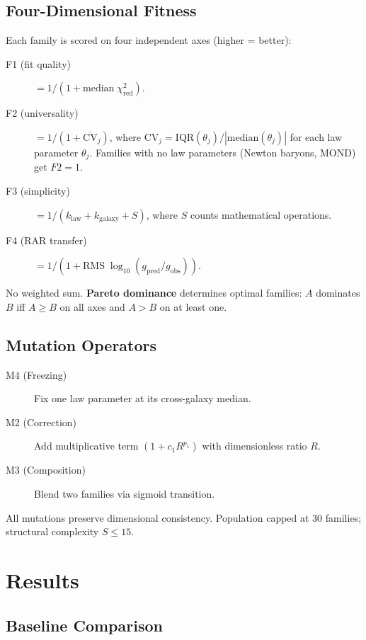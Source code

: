 \documentclass[aps,prl,twocolumn,superscriptaddress,showpacs]{revtex4-2}
\begin{document}
\subsection{Four-Dimensional Fitness}\label{sec:fitness}

Each family is scored on four independent axes (higher = better):

\begin{description}
    \item[F1 (fit quality)] $= 1/(1 + \mathrm{median}\;\chi^2_\mathrm{red})$.
    \item[F2 (universality)] $= 1/(1 + \overline{\mathrm{CV}}_j)$, where $\mathrm{CV}_j = \mathrm{IQR}(\theta_j)/|\mathrm{median}(\theta_j)|$ for each law parameter $\theta_j$. Families with no law parameters (Newton baryons, MOND) get $F2=1$.
    \item[F3 (simplicity)] $= 1/(k_\mathrm{law} + k_\mathrm{galaxy} + S)$, where $S$ counts mathematical operations.
    \item[F4 (RAR transfer)] $= 1/(1 + \mathrm{RMS}\;\log_{10}(g_\mathrm{pred}/g_\mathrm{obs}))$.
\end{description}

No weighted sum. \textbf{Pareto dominance} determines optimal families: $A$ dominates $B$ iff $A \geq B$ on all axes and $A > B$ on at least one.

\subsection{Mutation Operators}\label{sec:mutations}

\begin{description}
    \item[M4 (Freezing)] Fix one law parameter at its cross-galaxy median.
    \item[M2 (Correction)] Add multiplicative term $(1 + c_1 R^{p_1})$ with dimensionless ratio $R$.
    \item[M3 (Composition)] Blend two families via sigmoid transition.
\end{description}

All mutations preserve dimensional consistency. Population capped at 30 families; structural complexity $S \leq 15$.

\section{Results}\label{sec:results}

\subsection{Baseline Comparison}\label{sec:baselines}
\end{document}
